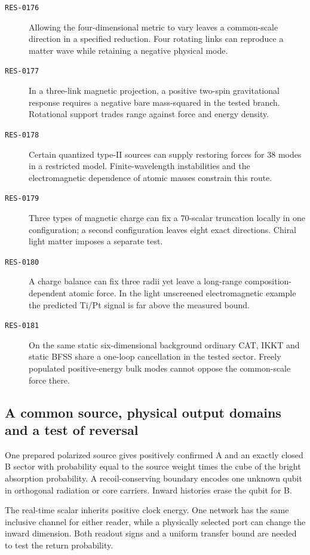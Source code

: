 \begin{description}
\item[\textnormal{\texttt{RES-0176}}] Allowing the four-dimensional metric to vary leaves a common-scale direction in a specified reduction. Four rotating links can reproduce a matter wave while retaining a negative physical mode.
\item[\textnormal{\texttt{RES-0177}}] In a three-link magnetic projection, a positive two-spin gravitational response requires a negative bare mass-squared in the tested branch. Rotational support trades range against force and energy density.
\item[\textnormal{\texttt{RES-0178}}] Certain quantized type-II sources can supply restoring forces for 38 modes in a restricted model. Finite-wavelength instabilities and the electromagnetic dependence of atomic masses constrain this route.
\item[\textnormal{\texttt{RES-0179}}] Three types of magnetic charge can fix a 70-scalar truncation locally in one configuration; a second configuration leaves eight exact directions. Chiral light matter imposes a separate test.
\item[\textnormal{\texttt{RES-0180}}] A charge balance can fix three radii yet leave a long-range composition-dependent atomic force. In the light unscreened electromagnetic example the predicted Ti/Pt signal is far above the measured bound.
\item[\textnormal{\texttt{RES-0181}}] On the same static six-dimensional background ordinary CAT, IKKT and static BFSS share a one-loop cancellation in the tested sector. Freely populated positive-energy bulk modes cannot oppose the common-scale force there.
\end{description}

\subsection{A common source, physical output domains and a test of reversal}
\begin{description}\small
\setlength{\itemsep}{.25em}\setlength{\parskip}{0pt}
\item[\textnormal{\texttt{RES-0182}}] One prepared polarized source gives positively confirmed A and an exactly closed B sector with probability equal to the source weight times the cube of the bright absorption probability. A recoil-conserving boundary encodes one unknown qubit in orthogonal radiation or core carriers. Inward histories erase the qubit for B.
\item[\textnormal{\texttt{RES-0183}}] The real-time scalar inherits positive clock energy. One network has the same inclusive channel for either reader, while a physically selected port can change the inward dimension. Both readout signs and a uniform transfer bound are needed to test the return probability.
\end{description}
